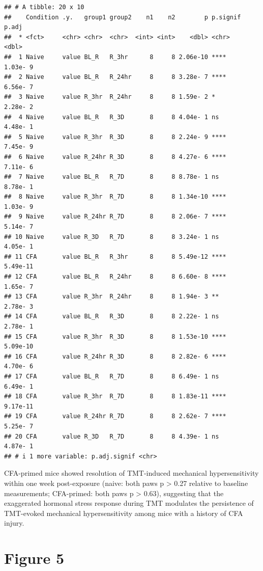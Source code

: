 \documentclass[
]{book}
\begin{document}
\begin{verbatim}
## # A tibble: 20 x 10
##    Condition .y.   group1 group2    n1    n2        p p.signif    p.adj
##  * <fct>     <chr> <chr>  <chr>  <int> <int>    <dbl> <chr>       <dbl>
##  1 Naive     value BL_R   R_3hr      8     8 2.06e-10 ****     1.03e- 9
##  2 Naive     value BL_R   R_24hr     8     8 3.28e- 7 ****     6.56e- 7
##  3 Naive     value R_3hr  R_24hr     8     8 1.59e- 2 *        2.28e- 2
##  4 Naive     value BL_R   R_3D       8     8 4.04e- 1 ns       4.48e- 1
##  5 Naive     value R_3hr  R_3D       8     8 2.24e- 9 ****     7.45e- 9
##  6 Naive     value R_24hr R_3D       8     8 4.27e- 6 ****     7.11e- 6
##  7 Naive     value BL_R   R_7D       8     8 8.78e- 1 ns       8.78e- 1
##  8 Naive     value R_3hr  R_7D       8     8 1.34e-10 ****     1.03e- 9
##  9 Naive     value R_24hr R_7D       8     8 2.06e- 7 ****     5.14e- 7
## 10 Naive     value R_3D   R_7D       8     8 3.24e- 1 ns       4.05e- 1
## 11 CFA       value BL_R   R_3hr      8     8 5.49e-12 ****     5.49e-11
## 12 CFA       value BL_R   R_24hr     8     8 6.60e- 8 ****     1.65e- 7
## 13 CFA       value R_3hr  R_24hr     8     8 1.94e- 3 **       2.78e- 3
## 14 CFA       value BL_R   R_3D       8     8 2.22e- 1 ns       2.78e- 1
## 15 CFA       value R_3hr  R_3D       8     8 1.53e-10 ****     5.09e-10
## 16 CFA       value R_24hr R_3D       8     8 2.82e- 6 ****     4.70e- 6
## 17 CFA       value BL_R   R_7D       8     8 6.49e- 1 ns       6.49e- 1
## 18 CFA       value R_3hr  R_7D       8     8 1.83e-11 ****     9.17e-11
## 19 CFA       value R_24hr R_7D       8     8 2.62e- 7 ****     5.25e- 7
## 20 CFA       value R_3D   R_7D       8     8 4.39e- 1 ns       4.87e- 1
## # i 1 more variable: p.adj.signif <chr>
\end{verbatim}

CFA-primed mice showed resolution of TMT-induced mechanical hypersensitivity within one week post-exposure (naive: both paws p \textgreater{} 0.27 relative to baseline measurements; CFA-primed: both paws p \textgreater{} 0.63), suggesting that the exaggerated hormonal stress response during TMT modulates the persistence of TMT-evoked mechanical hypersensitivity among mice with a history of CFA injury.

\chapter*{Figure 5}\label{figure-5}
\end{document}
